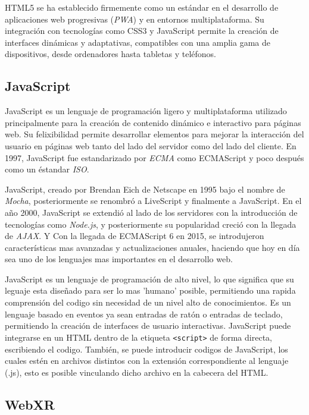 \documentclass[a4paper, 12pt]{book}
\begin{document}
HTML5 se ha establecido firmemente como un estándar en el desarrollo de aplicaciones web progresivas (\textit{PWA}) y en entornos multiplataforma. Su integración con tecnologías como CSS3 y JavaScript
permite la creación de interfaces dinámicas y adaptativas, compatibles con una amplia gama de dispositivos, desde ordenadores hasta tabletas y teléfonos.

\subsection{JavaScript}
\label{subsec:JavaScript}
JavaScript es un lenguaje de programación ligero y multiplataforma utilizado principalmente para la creación de contenido dinámico e interactivo para páginas web.
Su felixibilidad permite desarrollar elementos para mejorar la interacción del usuario en páginas web tanto del lado del servidor como del lado del cliente. En 1997, JavaScript fue estandarizado
por \textit{ECMA} como ECMAScript y poco después como un éstandar \textit{ISO}.

JavaScript, creado por Brendan Eich de Netscape en 1995 bajo el nombre de \textit{Mocha}, posteriormente se renombró a LiveScript y finalmente a JavaScript.
En el año 2000, JavaScript se extendió al lado de los servidores con la introducción de tecnologías como \textit{Node.js}, y posteriormente su popularidad creció con la llegada de \textit{AJAX}. Y Con la llegada de ECMAScript 6 en 2015, se introdujeron características mas avanzadas y
actualizaciones anuales, haciendo que hoy en día sea uno de los lenguajes mas importantes en el desarrollo web.

JavaScript es un lenguaje de programación de alto nivel, lo que significa que su leguaje esta diseñado para ser lo mas 'humano' posible, permitiendo una rapida comprensión del codigo sin necesidad de un nivel alto de conocimientos.
Es un lenguaje basado en eventos ya sean entradas de ratón o entradas de teclado, permitiendo la creación de interfaces de usuario interactivas. JavaScript puede integrarse en un HTML dentro de la etiqueta \texttt{<script>} de forma directa, escribiendo el codigo.
También, se puede introducir codigos de JavaScript, los cuales estén en archivos distintos con la extensión correspondiente al lenguaje (.js), esto es posible vinculando dicho archivo en la cabecera del HTML.

\subsection{WebXR}
\label{subsec:WebXR}
\end{document}
